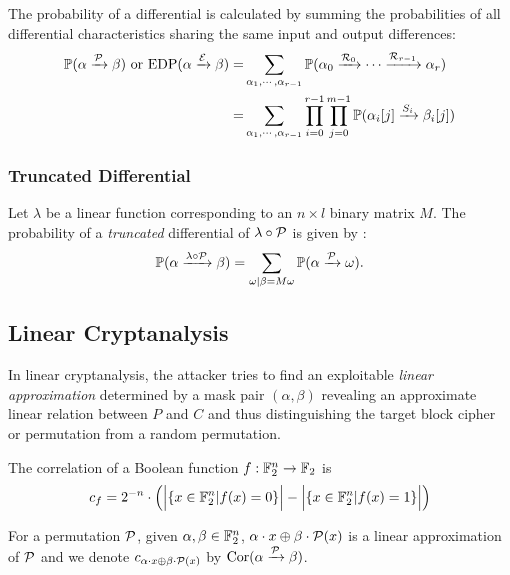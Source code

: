 The probability of a differential is calculated by summing the probabilities of all differential characteristics sharing the same input and output differences:
\begin{align*}
    \mathbb{P}(\alpha\xrightarrow{\mathcal{P}}\beta) \text{ or } \text{EDP}(\alpha\xrightarrow{\mathcal{E}}\beta)=&\sum\limits_{\alpha_1,\cdots,\alpha_{r-1}}\mathbb{P}(\alpha_0\xrightarrow{\mathcal{R}_0}\cdots\xrightarrow{\mathcal{R}_{r-1}}\alpha_r)\\
    =&\sum\limits_{\alpha_1,\cdots,\alpha_{r-1}}\prod\limits_{i=0}^{r-1}\prod\limits_{j=0}^{m-1}\mathbb{P}(\alpha_i[j]\xrightarrow{S_i}\beta_i[j])
\end{align*}

\subsubsection{Truncated Differential}
Let $\lambda$ be a linear function corresponding to an $n\times l$ binary matrix $M$. The probability of a \textit{truncated} differential of $\lambda\circ\mathcal{P}$ is given by \cite{daemen2002design}:
\[
    \mathbb{P}(\alpha\xrightarrow{\lambda\circ\mathcal{P}}\beta)=\sum\limits_{\omega|\beta=M\omega}\mathbb{P}(\alpha\xrightarrow{\mathcal{P}}\omega).
\]

\subsection{Linear Cryptanalysis}

In linear cryptanalysis, the attacker tries to find an exploitable \textit{linear approximation} determined by a mask pair $(\alpha,\beta)$ revealing an approximate linear relation between $P$ and $C$ and thus distinguishing the target block cipher or permutation from a random permutation. 

\begin{definition}[Correlation]
    The correlation of a Boolean function $f:\mathbb{F}_2^n\rightarrow\mathbb{F}_2$ is
    \begin{align*}
        c_f=2^{-n}\cdot\Big(\Big| \{x\in\mathbb{F}_2^n|f(x)=0\} \Big|-\Big| \{x\in\mathbb{F}_2^n|f(x)=1\} \Big|\Big)
    \end{align*}
\end{definition}

\begin{definition}
    For a permutation $\mathcal{P}$, given $\alpha,\beta\in \mathbb{F}_2^n$, $\alpha\cdot x\oplus \beta\cdot\mathcal{P}(x)$ is a linear approximation of $\mathcal{P}$ and we denote $c_{\alpha\cdot x\oplus \beta\cdot\mathcal{P}(x)}$ by $\text{Cor}(\alpha\xrightarrow{\mathcal{P}}\beta)$.
\end{definition}

